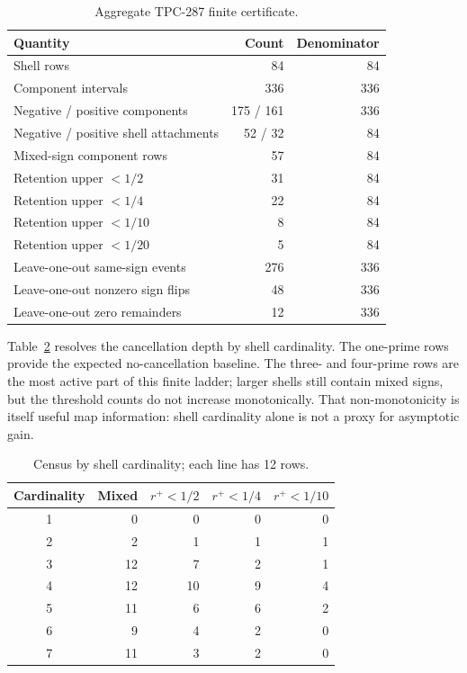 \documentclass[11pt]{article}
\newcommand{\1}{\mathbf{1}}
\begin{document}
\begin{table}[H]
\centering
\small
\caption{Aggregate TPC-287 finite certificate.}
\label{tab:aggregate}
\begin{tabular}{lrr}
\toprule
Quantity & Count & Denominator\\
\midrule
Shell rows & 84 & 84\\
Component intervals & 336 & 336\\
Negative / positive components & 175 / 161 & 336\\
Negative / positive shell attachments & 52 / 32 & 84\\
Mixed-sign component rows & 57 & 84\\
Retention upper $<1/2$ & 31 & 84\\
Retention upper $<1/4$ & 22 & 84\\
Retention upper $<1/10$ & 8 & 84\\
Retention upper $<1/20$ & 5 & 84\\
Leave-one-out same-sign events & 276 & 336\\
Leave-one-out nonzero sign flips & 48 & 336\\
Leave-one-out zero remainders & 12 & 336\\
\bottomrule
\end{tabular}
\end{table}

Table~\ref{tab:size} resolves the cancellation depth by shell cardinality.
The one-prime rows provide the expected no-cancellation baseline.  The
three- and four-prime rows are the most active part of this finite ladder;
larger shells still contain mixed signs, but the threshold counts do not
increase monotonically.  That non-monotonicity is itself useful map
information: shell cardinality alone is not a proxy for asymptotic gain.

\begin{table}[H]
\centering
\small
\caption{Census by shell cardinality; each line has 12 rows.}
\label{tab:size}
\begin{tabular}{c|rrrr}
\toprule
Cardinality & Mixed & $r^+<1/2$ & $r^+<1/4$ & $r^+<1/10$\\
\midrule
1 & 0  & 0  & 0 & 0\\
2 & 2  & 1  & 1 & 1\\
3 & 12 & 7  & 2 & 1\\
4 & 12 & 10 & 9 & 4\\
5 & 11 & 6  & 6 & 2\\
6 & 9  & 4  & 2 & 0\\
7 & 11 & 3  & 2 & 0\\
\bottomrule
\end{tabular}
\end{table}
\end{document}
